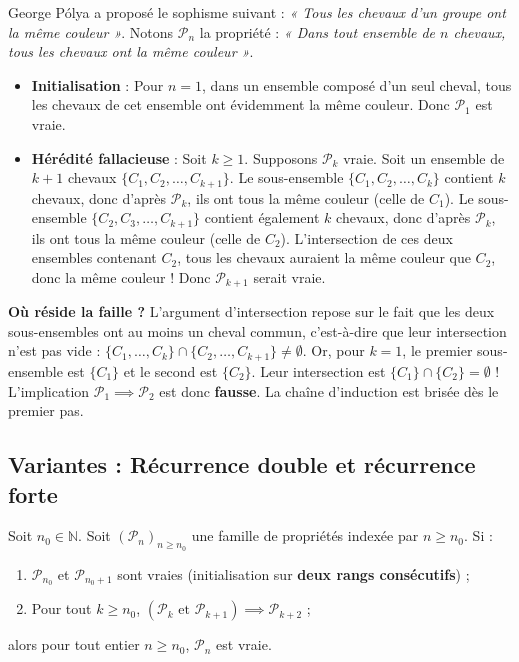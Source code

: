 \documentclass[11pt,a4paper]{article}
\newcommand{\N}{\mathbb{N}}
\begin{document}
\begin{remarquabox}
George Pólya a proposé le sophisme suivant : \textit{« Tous les chevaux d'un groupe ont la même couleur »}.
Notons $\mathcal{P}_n$ la propriété : \textit{« Dans tout ensemble de $n$ chevaux, tous les chevaux ont la même couleur »}.
\begin{itemize}
    \item \textbf{Initialisation} : Pour $n = 1$, dans un ensemble composé d'un seul cheval, tous les chevaux de cet ensemble ont évidemment la même couleur. Donc $\mathcal{P}_1$ est vraie.
    \item \textbf{Hérédité fallacieuse} : Soit $k \ge 1$. Supposons $\mathcal{P}_k$ vraie. Soit un ensemble de $k+1$ chevaux $\{C_1, C_2, \dots, C_{k+1}\}$.
    Le sous-ensemble $\{C_1, C_2, \dots, C_k\}$ contient $k$ chevaux, donc d'après $\mathcal{P}_k$, ils ont tous la même couleur (celle de $C_1$).
    Le sous-ensemble $\{C_2, C_3, \dots, C_{k+1}\}$ contient également $k$ chevaux, donc d'après $\mathcal{P}_k$, ils ont tous la même couleur (celle de $C_2$).
    L'intersection de ces deux ensembles contenant $C_2$, tous les chevaux auraient la même couleur que $C_2$, donc la même couleur ! Donc $\mathcal{P}_{k+1}$ serait vraie.
\end{itemize}
\textbf{Où réside la faille ?}
L'argument d'intersection repose sur le fait que les deux sous-ensembles ont au moins un cheval commun, c'est-à-dire que leur intersection n'est pas vide : $\{C_1, \dots, C_k\} \cap \{C_2, \dots, C_{k+1}\} \neq \emptyset$.
Or, pour $k = 1$, le premier sous-ensemble est $\{C_1\}$ et le second est $\{C_2\}$. Leur intersection est $\{C_1\} \cap \{C_2\} = \emptyset$ !
L'implication $\mathcal{P}_1 \implies \mathcal{P}_2$ est donc \textbf{fausse}. La chaîne d'induction est brisée dès le premier pas.
\end{remarquabox}

\subsection{Variantes : Récurrence double et récurrence forte}

\begin{theoremebox}
Soit $n_0 \in \N$. Soit $(\mathcal{P}_n)_{n \ge n_0}$ une famille de propriétés indexée par $n \ge n_0$.
Si :
\begin{enumerate}
    \item $\mathcal{P}_{n_0}$ et $\mathcal{P}_{n_0+1}$ sont vraies (initialisation sur \textbf{deux rangs consécutifs}) ;
    \item Pour tout $k \ge n_0$, $(\mathcal{P}_k \text{ et } \mathcal{P}_{k+1}) \implies \mathcal{P}_{k+2}$ ;
\end{enumerate}
alors pour tout entier $n \ge n_0$, $\mathcal{P}_n$ est vraie.
\end{theoremebox}
\end{document}
